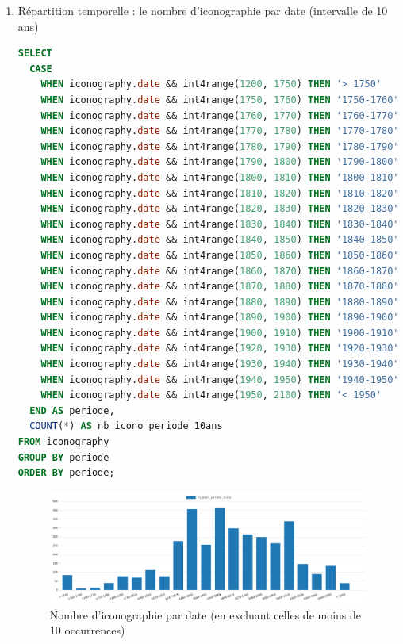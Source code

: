 \begin{enumerate}
\begin{enumerate}
        \item Répartition temporelle : le nombre d'iconographie par date (intervalle de 10 ans)
            \begin{lstlisting}[language=SQL, caption=Nombre d'iconographies par date (intervalle de 10 ans)]
SELECT 
  CASE 
    WHEN iconography.date && int4range(1200, 1750) THEN '> 1750' 
    WHEN iconography.date && int4range(1750, 1760) THEN '1750-1760' 
	WHEN iconography.date && int4range(1760, 1770) THEN '1760-1770' 
	WHEN iconography.date && int4range(1770, 1780) THEN '1770-1780' 
	WHEN iconography.date && int4range(1780, 1790) THEN '1780-1790' 
	WHEN iconography.date && int4range(1790, 1800) THEN '1790-1800' 
	WHEN iconography.date && int4range(1800, 1810) THEN '1800-1810' 
	WHEN iconography.date && int4range(1810, 1820) THEN '1810-1820' 
	WHEN iconography.date && int4range(1820, 1830) THEN '1820-1830' 
	WHEN iconography.date && int4range(1830, 1840) THEN '1830-1840' 
	WHEN iconography.date && int4range(1840, 1850) THEN '1840-1850' 
	WHEN iconography.date && int4range(1850, 1860) THEN '1850-1860' 
	WHEN iconography.date && int4range(1860, 1870) THEN '1860-1870' 
	WHEN iconography.date && int4range(1870, 1880) THEN '1870-1880' 
	WHEN iconography.date && int4range(1880, 1890) THEN '1880-1890' 
	WHEN iconography.date && int4range(1890, 1900) THEN '1890-1900' 
	WHEN iconography.date && int4range(1900, 1910) THEN '1900-1910' 
	WHEN iconography.date && int4range(1920, 1930) THEN '1920-1930' 
	WHEN iconography.date && int4range(1930, 1940) THEN '1930-1940' 
	WHEN iconography.date && int4range(1940, 1950) THEN '1940-1950' 
	WHEN iconography.date && int4range(1950, 2100) THEN '< 1950' 
  END AS periode, 
  COUNT(*) AS nb_icono_periode_10ans
FROM iconography 
GROUP BY periode 
ORDER BY periode; \end{lstlisting}

        \begin{figure}[ht!]
                    \centering
                    \includegraphics[width=1\linewidth]{images/graphiques/nb_icono_date_10.png}
                    \caption{Nombre d'iconographie par date (en excluant celles de moins de 10 occurrences)}
                    \label{fig:nb_icono_date10}
                \end{figure}


\end{enumerate}
\end{enumerate}
